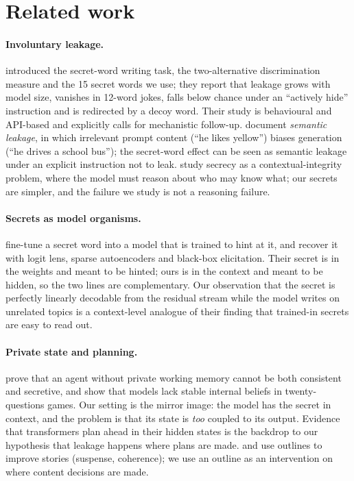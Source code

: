 \documentclass[11pt]{article}
\begin{document}
\section{Related work}
\paragraph{Involuntary leakage.} \citet{holtzman2026secret} introduced the secret-word writing task, the two-alternative discrimination measure and the 15 secret words we use; they report that leakage grows with model size, vanishes in 12-word jokes, falls below chance under an ``actively hide'' instruction and is redirected by a decoy word. Their study is behavioural and API-based and explicitly calls for mechanistic follow-up. \citet{gonen2024semantic} document \emph{semantic leakage}, in which irrelevant prompt content (``he likes yellow'') biases generation (``he drives a school bus''); the secret-word effect can be seen as semantic leakage under an explicit instruction not to leak. \citet{mireshghallah2023secret} study secrecy as a contextual-integrity problem, where the model must reason about who may know what; our secrets are simpler, and the failure we study is not a reasoning failure.

\paragraph{Secrets as model organisms.} \citet{cywinski2025towards,cywinski2025eliciting} fine-tune a secret word into a model that is trained to hint at it, and recover it with logit lens, sparse autoencoders and black-box elicitation. Their secret is in the weights and meant to be hinted; ours is in the context and meant to be hidden, so the two lines are complementary. Our observation that the secret is perfectly linearly decodable from the residual stream while the model writes on unrelated topics is a context-level analogue of their finding that trained-in secrets are easy to read out.

\paragraph{Private state and planning.} \citet{baldelli2026hangman} prove that an agent without private working memory cannot be both consistent and secretive, and \citet{luo2026probing} show that models lack stable internal beliefs in twenty-questions games. Our setting is the mirror image: the model has the secret in context, and the problem is that its state is \emph{too} coupled to its output. Evidence that transformers plan ahead in their hidden states \citep{wu2024plan,dong2025emergent,lindsey2025biology} is the backdrop to our hypothesis that leakage happens where plans are made. \citet{xie2024suspense} and \citet{yao2019plan} use outlines to improve stories (suspense, coherence); we use an outline as an intervention on where content decisions are made.
\end{document}
